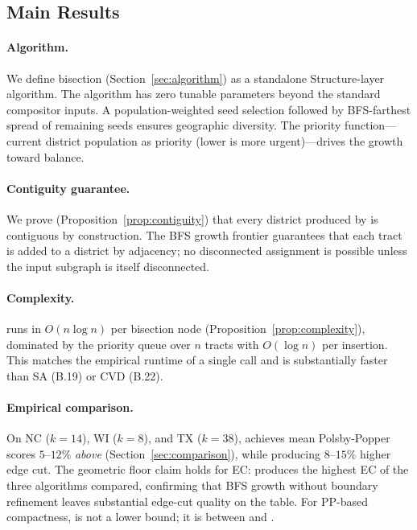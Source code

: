 \subsection{Main Results}

\paragraph{Algorithm.}
We define \bfsg{} bisection (Section~\ref{sec:algorithm}) as a
standalone Structure-layer algorithm.
The algorithm has zero tunable parameters beyond the standard compositor
inputs.
A population-weighted seed selection followed by BFS-farthest spread
of remaining seeds ensures geographic diversity.
The priority function---current district population as priority (lower
is more urgent)---drives the growth toward balance.

\paragraph{Contiguity guarantee.}
We prove (Proposition~\ref{prop:contiguity}) that every district produced
by \bfsg{} is contiguous by construction.
The BFS growth frontier guarantees that each tract is added to a district
by adjacency; no disconnected assignment is possible unless the input
subgraph is itself disconnected.

\paragraph{Complexity.}
\bfsg{} runs in $O(n \log n)$ per bisection node (Proposition~\ref{prop:complexity}),
dominated by the priority queue over $n$ tracts with $O(\log n)$
per insertion.
This matches the empirical runtime of a single \metis{} call and is
substantially faster than SA (B.19) or CVD (B.22).

\paragraph{Empirical comparison.}
On NC ($k=14$), WI ($k=8$), and TX ($k=38$), \bfsg{} achieves
mean Polsby-Popper scores $5$--$12\%$ \emph{above} \metis{}
(Section~\ref{sec:comparison}), while producing $8$--$15\%$ higher edge
cut.
The geometric floor claim holds for EC: \bfsg{} produces the highest EC
of the three algorithms compared, confirming that BFS growth without
boundary refinement leaves substantial edge-cut quality on the table.
For PP-based compactness, \bfsg{} is not a lower bound; it is between
\metis{} and \cvd{}.

